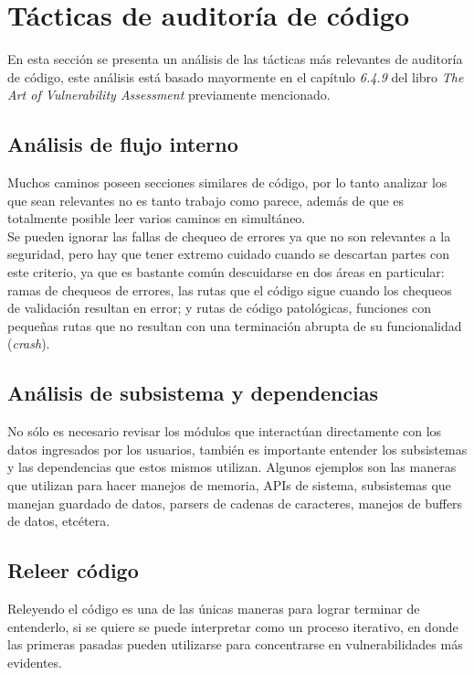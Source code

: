 \section{Tácticas de auditoría de código}
En esta sección se presenta un análisis de las tácticas más relevantes de auditoría de código, este análisis está basado mayormente en el capítulo \textit{6.4.9} del libro \textit{The Art of Vulnerability Assessment}\cite{Dowd:2006:ASS:1196394} previamente mencionado.

\subsection{Análisis de flujo interno}
Muchos caminos poseen secciones similares de código, por lo tanto analizar los que sean relevantes no es tanto trabajo como parece, además de que es totalmente posible leer varios caminos en simultáneo.\\

Se pueden ignorar las fallas de chequeo de errores ya que no son relevantes a la seguridad, pero hay que tener extremo cuidado cuando se descartan partes con este criterio, ya que es bastante común descuidarse en dos áreas en particular: ramas de chequeos de errores, las rutas que el código sigue cuando los chequeos de validación resultan en error; y rutas de código patológicas, funciones con pequeñas rutas que no resultan con una terminación abrupta de su funcionalidad (\textit{crash}).

\subsection{Análisis de subsistema y dependencias}
No sólo es necesario revisar los módulos que interactúan directamente con los datos ingresados por los usuarios, también es importante entender los subsistemas y las dependencias que estos mismos utilizan. Algunos ejemplos son las maneras que utilizan para hacer manejos de memoria, APIs de sistema, subsistemas que manejan guardado de datos, parsers de cadenas de caracteres, manejos de buffers de datos, etcétera.


\subsection{Releer código}
Releyendo el código es una de las únicas maneras para lograr terminar de entenderlo, si se quiere se puede interpretar como un proceso iterativo, en donde las primeras pasadas pueden utilizarse para concentrarse en vulnerabilidades más evidentes.


